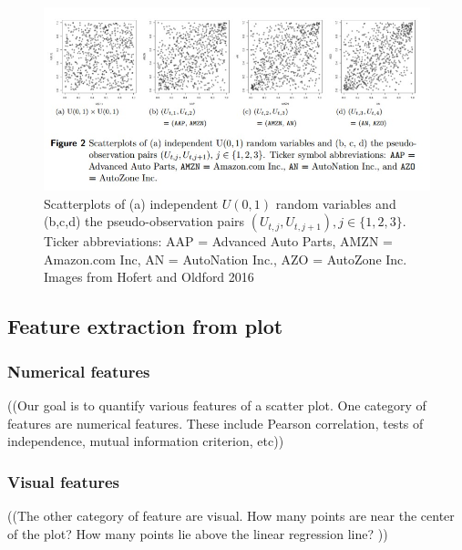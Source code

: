 \begin{figure}[htb]
	\begin{center}
		\includegraphics[width=0.75\linewidth]{ch-visualizer/figures/hofertoldford}
		\caption[Scatterplots of independent $U(0,1)$ random variables and the
		pseudo-observation pairs $(U_{t,j},U_{t,j+1}),j\in 
		\{1,2,3\}$.]{Scatterplots of
			(a) independent $U(0,1)$ random variables and (b,c,d) the 
			pseudo-observation
			pairs $(U_{t,j},U_{t,j+1}),j\in \{1,2,3\}$. Ticker abbreviations: 
			AAP = Advanced
			Auto Parts, AMZN = Amazon.com Inc, AN = AutoNation Inc., AZO = 
			AutoZone Inc.
			Images from Hofert and Oldford 2016~\cite{hofert2016}}
		\label{fig:visualizer:hofertoldford}
	\end{center}
\end{figure}

\subsection{Feature extraction from plot}
\label{sec:visualizer:features}

\subsubsection{Numerical features}

((Our goal is to quantify various features of a scatter plot. One category of
features are numerical features. These include Pearson correlation, tests of
independence, mutual information criterion, etc))

\subsubsection{Visual features}

((The other category of feature are visual. How many points are near the center
of the plot? How many points lie above the linear regression line? ))


